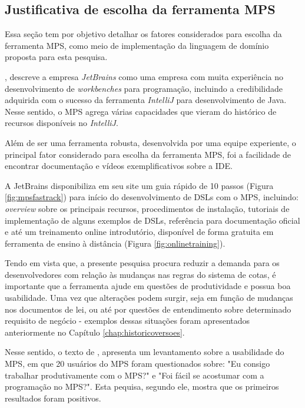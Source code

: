 \subsection{Justificativa de escolha da ferramenta MPS}
\label{justificativamps}

Essa seção tem por objetivo detalhar os fatores considerados para escolha da ferramenta \gls{MPS}, como meio de implementação da linguagem de domínio proposta para esta pesquisa.

, descreve a empresa \textit{JetBrains} como uma empresa com muita experiência no desenvolvimento de \textit{workbenches} para programação, incluindo a credibilidade adquirida com o sucesso da ferramenta \textit{IntelliJ} para desenvolvimento de Java.  Nesse sentido, o \gls{MPS} agrega várias capacidades que vieram do histórico de recursos disponíveis no \textit{IntelliJ}. 

Além de ser uma ferramenta robusta, desenvolvida por uma equipe experiente, o principal fator considerado para escolha da ferramenta \gls{MPS}, foi a facilidade de encontrar documentação e vídeos exemplificativos sobre a \gls{IDE}. 

A JetBrains disponibiliza em seu site um guia rápido de 10 passos (Figura \ref{fig:mpsfastrack}) para início do desenvolvimento de \gls{DSL}s com o \gls{MPS}, incluindo: \textit{overview} sobre os principais recursos, procedimentos de instalação, tutoriais de implementação de alguns exemplos de \gls{DSL}s, referência para documentação oficial e até um treinamento online introdutório, disponível de forma gratuita em ferramenta de ensino à distância (Figura \ref{fig:onlinetraining}).  





\newpage
Tendo em vista que, a presente pesquisa procura reduzir a demanda para os desenvolvedores com relação às mudanças nas regras do sistema de cotas, é importante que a ferramenta ajude em questões de produtividade e possua boa usabilidade. Uma vez que alterações podem surgir, seja em função de mudanças nos documentos de lei, ou até por questões de entendimento sobre determinado requisito de negócio - exemplos dessas situações foram apresentados anteriormente no Capítulo \ref{chap:historicoversoes}.

Nesse sentido, o texto de  , apresenta um levantamento sobre a usabilidade do \gls{MPS}, em que 20 usuários do \gls{MPS} foram questionados sobre: "Eu consigo trabalhar produtivamente com o MPS?" e "Foi fácil se acostumar com a programação no MPS?". Esta pequisa, segundo ele, mostra que os primeiros resultados foram positivos. 

